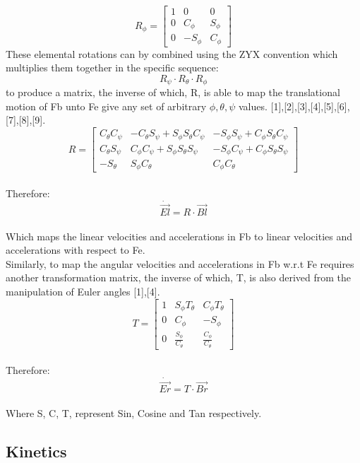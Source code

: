 \documentclass[12pt,a4paper,twoside]{report}
\begin{document}
				\\
				$$
				R_\phi = 
				\begin{bmatrix}
					1 & 0 & 0 \\
					0 & C_\phi & S_\phi  \\
					0 & -S_\phi & C_\phi
				\end{bmatrix}
				$$
				\space
				These elemental rotations can by combined using the ZYX convention which multiplies them together in the specific sequence:
				\[R_\psi \cdot R_\theta \cdot R_\phi\]
				to produce a matrix, the inverse of which, R, is able to map the translational motion of Fb unto Fe give any set of arbitrary \(\phi, \theta, \psi\) values. [1],[2],[3],[4],[5],[6],[7],[8],[9].
				\\
				$$
				R = 
				\begin{bmatrix}
					C_\theta C_\psi & -C_\theta S_\psi + S_\phi S_\theta C_\psi & -S_\phi S_\psi + C_\phi S_\theta C_\psi \\
					C_\theta S_\psi &  C_\phi C_\psi + S_\phi S_\theta S_\psi   & -S_\phi C_\psi + C_\phi S_\theta S_\psi \\
					-S_\theta       &  S_\phi C_\theta                          &  C_\phi C_\theta
				\end{bmatrix}
				$$
				\\
				Therefore: 
				\[ \dot{\vec{El}} = R \cdot \vec{Bl} \]
				\\
				Which maps the linear velocities and accelerations in Fb to linear velocities and accelerations with respect to Fe.
				\\
				Similarly, to map the angular velocities and accelerations in Fb w.r.t Fe requires another transformation matrix, the inverse of which, T, is also derived from the manipulation of Euler angles [1],[4]. 
				\\
				$$
				T = 
				\begin{bmatrix}
					1 & S_\phi T_\theta & C_\phi T_\theta \\
					0 & C_\phi & -S_\phi\\
					0 & \frac{S_\phi}{C_\theta}  & \frac{C_\phi}{C_\theta}
				\end{bmatrix}
				$$ 
				\\
				Therefore:
				\\
				\[\dot{\vec{Er}} = T \cdot \vec{Br} \]
				\\
				Where S, C, T, represent Sin, Cosine and Tan respectively.
				
			\subsection{Kinetics}
			
\end{document}

